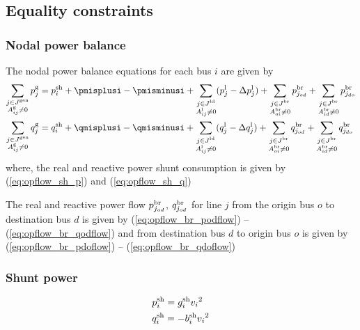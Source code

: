 \subsection{Equality constraints}\label{sec:opflow_eq}

\subsubsection{Nodal power balance}
The nodal power balance equations for each bus $i$ are given by
\begin{align}
\sum_{\substack{\jinJgen \\ A^{\text{g}}_{ij} \neq 0}} \pgj &=   \pshi + \pmisplusi - \pmisminusi + \sum_{\substack{\jinJload \\ A^{\text{l}}_{ij} \neq 0}} (\plj - \Deltaplj) + \sum_{\substack{\jinJbr \\ A^{\text{br}}_{oi} \neq 0}} \pbrjod + \sum_{\substack{\jinJbr \\ A^{\text{br}}_{id} \neq 0}} \pbrjdo \\
\sum_{\substack{\jinJgen \\ A^{\text{g}}_{ij} \neq 0}} \qgj &=  \qshi + \qmisplusi - \qmisminusi + \sum_{\substack{\jinJload \\ A^{\text{l}}_{ij} \neq 0}} (\qlj - \Deltaqlj) +
\sum_{\substack{\jinJbr \\ A^{\text{br}}_{oi} \neq 0}} \qbrjod + \sum_{\substack{\jinJbr \\ A^{\text{br}}_{id} \neq 0}} \qbrjdo \\
\end{align}
where, the real and reactive power shunt consumption is given by (\ref{eq:opflow_sh_p}) and (\ref{eq:opflow_sh_q})


The real and reactive power flow $p^\text{br}_{j_{od}}$, $q^\text{br}_{j_{od}}$ for line $j$ from the origin bus $o$ to destination bus $d$ is given by (\ref{eq:opflow_br_podflow}) -- 
 (\ref{eq:opflow_br_qodflow})
and from destination bus $d$ to origin bus $o$ is given by (\ref{eq:opflow_br_pdoflow}) -- 
 (\ref{eq:opflow_br_qdoflow})

 \subsubsection{Shunt power}
\begin{align}
&p^{\text{sh}}_i = g^\text{sh}_i{v_i}^2 \label{eq:opflow_sh_p} \\
&q^{\text{sh}}_i = -b^\text{sh}_i{v_i}^2 \label{eq:opflow_sh_q}
\end{align}

